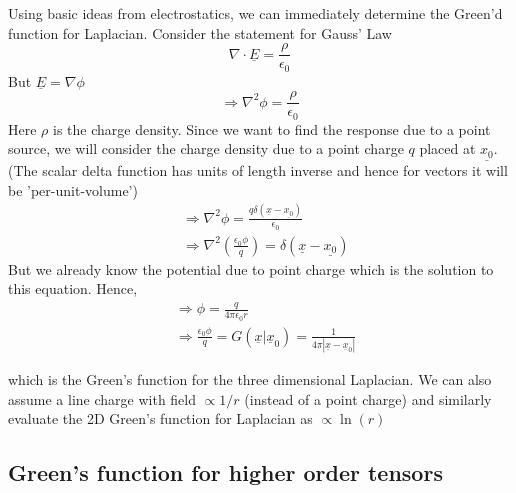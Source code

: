 \documentclass[11pt, letterpaper]{article}
\newcommand{\1}{\bm{1}}
\newcommand{\un}[1]{\underline{#1}}
\begin{document}
Using basic ideas from electrostatics, we can immediately determine the Green'd function for Laplacian. Consider the statement for Gauss' Law
$$
\nabla \cdot \un{E} = \frac{\rho}{\epsilon_0}
$$
But $\un{E}=\nabla\phi$
$$
\Rightarrow \nabla ^2\phi = \frac{\rho}{\epsilon_0}
$$
Here $\rho$ is the charge density. Since we want to find the response due to a point source, we will consider the charge density due to a point charge $q$ placed at $\un{x_0}$. (The scalar delta function has units of length inverse and hence for vectors it will be 'per-unit-volume')
\begin{align*}
&\Rightarrow \nabla ^2\phi = \frac{q \delta(\un{x}-\un{x_0})}{\epsilon_0}\\
&\Rightarrow \nabla ^2 (\frac{\epsilon_0\phi}{q}) = \delta(\un{x}-\un{x_0})
\end{align*}
But we already know the potential due to point charge which is the solution to this equation. Hence,
\begin{align*}
&\Rightarrow \phi = \frac{q}{4\pi\epsilon_0 r}\\
&\Rightarrow \frac{\epsilon_0\phi}{q} = G(\un{x}|\un{x}_0) = \frac{1}{4\pi |\un{x}-\un{x}_0|}
\end{align*}

which is the Green's function for the three dimensional Laplacian. We can also assume a line charge with field $\propto 1/r$ (instead of a point charge) and similarly evaluate the 2D Green's function for Laplacian as $\propto\ln(r)$

\subsection{Green's function for higher order tensors}
\end{document}
